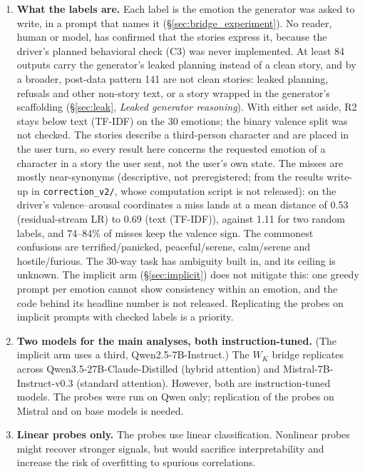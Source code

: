 \begin{enumerate}[nosep]
    \item \textbf{What the labels are.} Each label is the emotion the generator was asked to write, in a prompt that names it (\S\ref{sec:bridge_experiment}). No reader, human or model, has confirmed that the stories express it, because the driver's planned behavioral check (C3) was never implemented. At least 84 outputs carry the generator's leaked planning instead of a clean story, and by a broader, post-data pattern 141 are not clean stories: leaked planning, refusals and other non-story text, or a story wrapped in the generator's scaffolding (\S\ref{sec:leak}, \emph{Leaked generator reasoning}). With either set aside, R2 stays below text (TF-IDF) on the 30 emotions; the binary valence split was not checked. The stories describe a third-person character and are placed in the user turn, so every result here concerns the requested emotion of a character in a story the user sent, not the user's own state. The misses are mostly near-synonyms (descriptive, not preregistered; from the results write-up in \texttt{correction\_v2/}, whose computation script is not released): on the driver's valence--arousal coordinates a miss lands at a mean distance of 0.53 (residual-stream LR) to 0.69 (text (TF-IDF)), against 1.11 for two random labels, and 74--84\% of misses keep the valence sign. The commonest confusions are terrified/panicked, peaceful/serene, calm/serene and hostile/furious. The 30-way task has ambiguity built in, and its ceiling is unknown. The implicit arm (\S\ref{sec:implicit}) does not mitigate this: one greedy prompt per emotion cannot show consistency within an emotion, and the code behind its headline number is not released. Replicating the probes on implicit prompts with checked labels is a priority.

    \item \textbf{Two models for the main analyses, both instruction-tuned.} (The implicit arm uses a third, Qwen2.5-7B-Instruct.) The $W_K$ bridge replicates across Qwen3.5-27B-Claude-Distilled (hybrid attention) and Mistral-7B-Instruct-v0.3 (standard attention). However, both are instruction-tuned models. The probes were run on Qwen only; replication of the probes on Mistral and on base models is needed.

    \item \textbf{Linear probes only.} The probes use linear classification. Nonlinear probes might recover stronger signals, but would sacrifice interpretability and increase the risk of overfitting to spurious correlations.


\end{enumerate}
